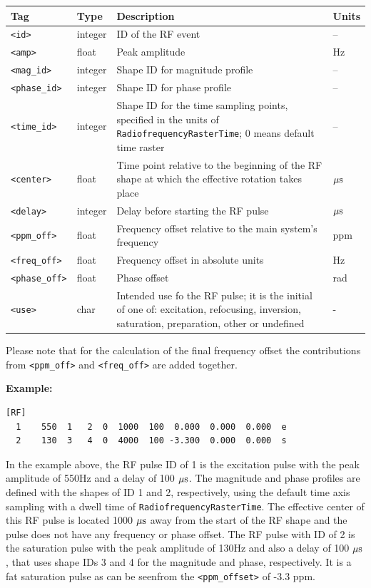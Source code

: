 \documentclass{article}
\begin{document}
\begin{tabularx}{\textwidth}{llXl}
\toprule
Tag & Type & Description & Units\\
\midrule
\verb.<id>. & integer & ID of the RF event & -- \\
\verb.<amp>. & float & Peak amplitude & Hz \\
\verb.<mag_id>. & integer & Shape ID for magnitude profile & -- \\
\verb.<phase_id>. & integer & Shape ID for phase profile & --\\
\verb.<time_id>. & integer & Shape ID for the time sampling points, specified in the units of \verb.RadiofrequencyRasterTime.; 0 means default time raster & -- \\
\verb.<center>. & float & Time point relative to the beginning of the RF shape at which the effective rotation takes place & $\rm \mu s$\\
\verb.<delay>. & integer & Delay before starting the RF pulse & $\rm \mu s$\\
\verb.<ppm_off>. & float & Frequency offset relative to the main system's frequency & ppm \\
\verb.<freq_off>. & float & Frequency offset in absolute units & Hz \\
\verb.<phase_off>. & float & Phase offset & rad \\
\verb.<use>. & char & Intended use fo the RF pulse; it is the initial of one of: 
excitation, refocusing, inversion, saturation,  preparation, other or undefined & - \\
\bottomrule
\end{tabularx}

Please note that for the calculation of the final frequency offset the contributions from \verb.<ppm_off>. and \verb.<freq_off>. are added together.

\begin{minipage}{\textwidth}
\textbf{Example:}
\begin{lstlisting}
[RF]
  1    550  1   2  0  1000  100  0.000  0.000  0.000  e
  2    130  3   4  0  4000  100 -3.300  0.000  0.000  s
\end{lstlisting}
\end{minipage}

In the example above, the RF pulse ID of 1 is the excitation pulse with the peak amplitude of 550Hz and a delay of 100 $\rm \mu s$. The magnitude and phase profiles are defined with the shapes of ID 1 and 2, respectively, using the default time axis sampling with a dwell time of \verb.RadiofrequencyRasterTime.. The effective center of this RF pulse is located 1000 $\rm \mu s$ away from the start of the RF shape and the pulse does not have any frequency or phase offset. The RF pulse with ID of 2 is the saturation pulse with the peak amplitude of 130Hz and also a delay of 100 $\rm \mu s$, that uses shape IDs 3 and 4 for the magnitude and phase, respectively. It is a fat saturation pulse as can be seenfrom the \verb.<ppm_offset>. of -3.3 ppm. \\
\end{document}
